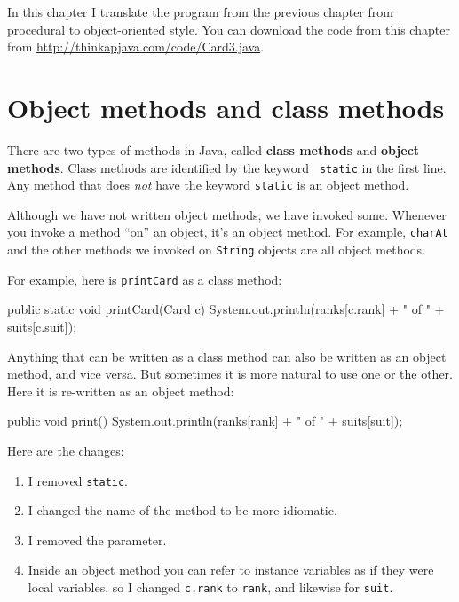In this chapter I translate the  program from the previous chapter from procedural to object-oriented style.
You can download the code from this chapter from \url{http://thinkapjava.com/code/Card3.java}.


\section{Object methods and class methods}


There are two types of methods in Java, called {\bf class methods} and
{\bf object methods}.  Class methods are identified by the keyword {\tt
  static} in the first line.  Any method that does {\em not} have the
keyword {\tt static} is an object method.

Although we have not written object methods, we have invoked some.
Whenever you invoke a method ``on'' an object, it's an object method.
For example, {\tt charAt} and the other methods we invoked on {\tt String}
objects are all object methods.

For example, here is {\tt printCard} as a class method:

\begin{code}
    public static void printCard(Card c) {
        System.out.println(ranks[c.rank] + " of " + suits[c.suit]);
    }
\end{code}

Anything that can be written as a class method can also be written as an
object method, and vice versa.  But sometimes it is more natural to
use one or the other.
Here it is re-written as an object method:

\begin{code}
    public void print() {
        System.out.println(ranks[rank] + " of " + suits[suit]);
    }
\end{code}

Here are the changes:

\begin{enumerate}

\item I removed {\tt static}.

\item I changed the name of the method to be more idiomatic.

\item I removed the parameter.

\item Inside an object method you can refer to instance variables
as if they were local variables, so I changed {\tt c.rank} to {\tt rank},
and likewise for {\tt suit}.

\end{enumerate}

